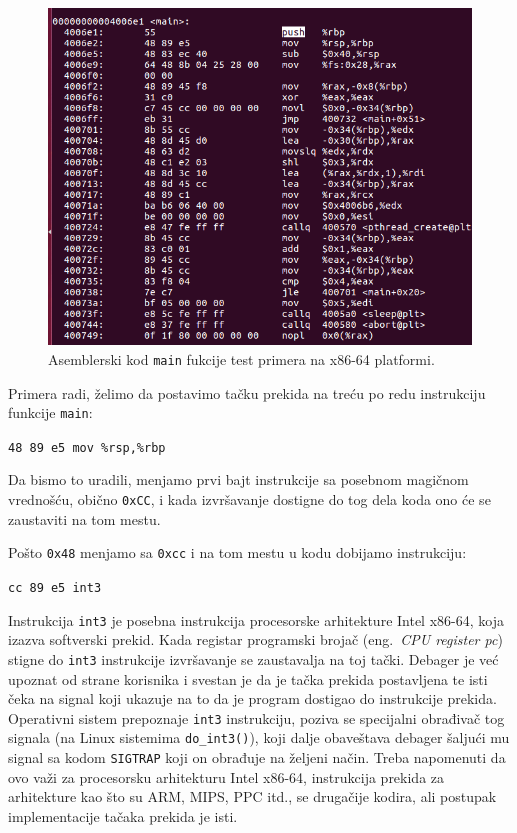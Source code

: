 \documentclass[12pt,oneside]{memoir}
\begin{document}
\begin{figure}[h!]
	\begin{center}
		\includegraphics[scale=0.4]{slike/example_bp.png}
	\end{center}
	\caption{Asemblerski kod \texttt{main} fukcije test primera na x86-64 platformi.}
	\label{fig:primer1}
\end{figure}

Primera radi, želimo da postavimo tačku prekida na treću po redu instrukciju funkcije \texttt{main}:

\texttt{48 89 e5  mov \%rsp,\%rbp}

Da bismo to uradili, menjamo prvi bajt instrukcije sa posebnom magičnom vrednošću, obično \texttt{0xCC}, i kada izvršavanje dostigne do tog dela koda ono će se zaustaviti na tom mestu.

Pošto \texttt{0x48} menjamo sa \texttt{0xcc} i na tom mestu u kodu dobijamo instrukciju:

\texttt{cc 89 e5  int3}

Instrukcija \texttt{int3} je posebna instrukcija procesorske arhitekture Intel x86-64, koja izazva softverski prekid. Kada registar programski brojač (eng.~\emph{CPU register pc}) stigne do \texttt{int3} instrukcije izvršavanje se zaustavalja na toj tački. Debager je već upoznat od strane korisnika i svestan je da je tačka prekida postavljena te isti čeka na signal koji ukazuje na to da je program dostigao do instrukcije prekida. Operativni sistem prepoznaje \texttt{int3} instrukciju, poziva se specijalni obrađivač tog signala (na Linux sistemima \texttt{do\_int3()}), koji dalje obaveštava debager šaljući mu signal sa kodom \texttt{SIGTRAP} koji on obrađuje na željeni način. Treba napomenuti da ovo važi za procesorsku arhitekturu Intel x86-64, instrukcija prekida za arhitekture kao što su ARM, MIPS, PPC itd., se drugačije kodira, ali postupak implementacije tačaka prekida je isti.
\end{document}
